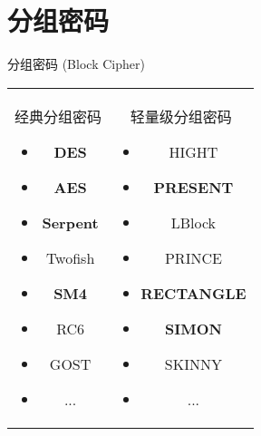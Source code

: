 \documentclass[xcolor=svgnames,handout]{beamer}
\begin{document}
\section{分组密码}
\begin{frame}
  {分组密码 (Block Cipher)}
  \begin{table}
  	\begin{tabular}{cc}
  		\begin{minipage}{.5\linewidth}
  			经典分组密码
  			\begin{itemize}
  				\item \begin{alertenv}\textbf{DES}\end{alertenv}
  				\item \begin{alertenv}\textbf{AES}\end{alertenv}
  				\item \begin{alertenv}\textbf{Serpent}\end{alertenv}
  				\item Twofish
  				\item \begin{alertenv}\textbf{SM4}\end{alertenv}
  				\item RC6
  				\item GOST
  				\item ...
  			\end{itemize}
  		\end{minipage}
  		&
  		\begin{minipage}{.5\linewidth}
  			轻量级分组密码
	  	    \begin{itemize}
	  	    	\item HIGHT
	  			\item \begin{alertenv}\textbf{PRESENT}\end{alertenv}\cite{bogdanov2007present}
	  			\item LBlock
	  			\item PRINCE
	  			\item \begin{alertenv}\textbf{RECTANGLE}\end{alertenv}\cite{zhang2015rectangle}
	  			\item \begin{alertenv}\textbf{SIMON}\end{alertenv}\cite{beaulieu2015simon}
	  			\item SKINNY
	  			\item ...
	  		\end{itemize}
  		\end{minipage}
  	\end{tabular}
  \end{table}
\end{frame}
\end{document}
